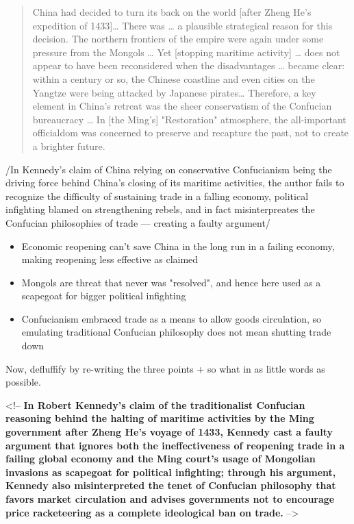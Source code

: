 \documentclass[letterpaper]{article}
\begin{document}
\begin{quote}
China had decided to turn its back on the world [after Zheng He's
expedition of 1433]\ldots{} There was \ldots{} a plausible strategical reason
for this decision. The northern frontiers of the empire were again
under some pressure from the Mongols \ldots{} Yet [stopping maritime
activity] \ldots{} does not appear to have been reconsidered when the
disadvantages \ldots{} became clear: within a century or so, the Chinese
coastline and even cities on the Yangtze were being attacked by
Japanese pirates\ldots{} Therefore, a key element in China's retreat was
the sheer conservatism of the Confucian bureaucracy \ldots{} In [the
Ming's] "Restoration" atmosphere, the all-important officialdom was
concerned to preserve and recapture the past, not to create a brighter
future.
\end{quote}

/In Kennedy's claim of China relying on conservative Confucianism being
the driving force behind China's closing of its maritime activities, the
author fails to recognize the difficulty of sustaining trade in a
falling economy, political infighting blamed on strengthening rebels,
and in fact misinterpreates the Confucian philosophies of trade ---
creating a faulty argument/

\begin{itemize}
\item Economic reopening can't save China in the long run in a failing
economy, making reopening less effective as claimed
\item Mongols are threat that never was "resolved", and hence here used as a
scapegoat for bigger political infighting
\item Confucianism embraced trade as a means to allow goods circulation, so
emulating traditional Confucian philosophy does not mean shutting
trade down
\end{itemize}

Now, defluffify by re-writing the three points + so what in as little
words as possible.

\begin{html}
<!--
    \textbf{\textbf{In Robert Kennedy's claim of the traditionalist Confucian reasoning behind the halting of maritime activities by the Ming government after Zheng He's voyage of 1433, Kennedy cast a faulty argument that ignores both the ineffectiveness of reopening trade in a failing global economy and the Ming court's usage of Mongolian invasions as scapegoat for political infighting; through his argument, Kennedy also misinterpreted the tenet of Confucian philosophy that favors market circulation and advises governments not to encourage price racketeering as a complete ideological ban on trade.}}
-->
\end{html}
\end{document}
